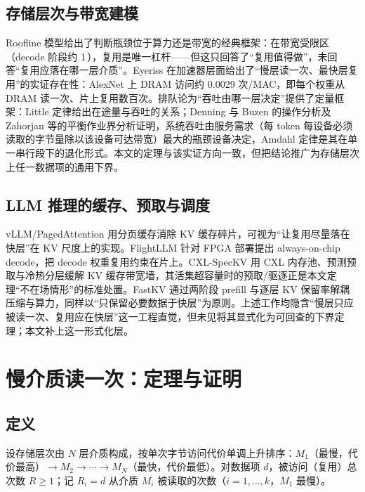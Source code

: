 \documentclass[11pt]{ctexart}
\begin{document}
\subsection{存储层次与带宽建模}

Roofline 模型\cite{roofline}给出了判断瓶颈位于算力还是带宽的经典框架：在带宽受限区（decode 阶段约 1\,），复用是唯一杠杆——但这只回答了“复用值得做”，未回答“复用应落在哪一层介质”。Eyeriss\cite{eyeriss} 在加速器层面给出了“慢层读一次、最快层复用”的实证存在性：AlexNet 上 DRAM 访问约 0.0029 次/MAC，即每个权重从 DRAM 读一次、片上复用数百次。排队论为“吞吐由哪一层决定”提供了定量框架：Little 定律\cite{little}给出在途量与吞吐的关系；Denning 与 Buzen 的操作分析\cite{denningbuzen}及 Zahorjan 等的平衡作业界分析\cite{aba}证明，系统吞吐由服务需求（每 token 每设备必须读取的字节量除以该设备可达带宽）最大的瓶颈设备决定，Amdahl 定律\cite{amdahl}是其在单一串行段下的退化形式。本文的定理与该实证方向一致，但把结论推广为存储层次上任一数据项的通用下界。

\subsection{LLM 推理的缓存、预取与调度}

vLLM/PagedAttention\cite{paged} 用分页缓存消除 KV 缓存碎片，可视为“让复用尽量落在快层”在 KV 尺度上的实现。FlightLLM\cite{flightllm} 针对 FPGA 部署提出 always-on-chip decode，把 decode 权重复用约束在片上。CXL-SpecKV\cite{cxlspeckv} 用 CXL 内存池、预测预取与冷热分层缓解 KV 缓存带宽墙，其活集超容量时的预取/驱逐正是本文定理“不在场情形”的标准处置。FastKV\cite{fastkv} 通过两阶段 prefill 与逐层 KV 保留率解耦压缩与算力，同样以“只保留必要数据于快层”为原则。上述工作均隐含“慢层只应被读一次、复用应在快层”这一工程直觉，但未见将其显式化为可回查的下界定理；本文补上这一形式化层。

\section{慢介质读一次：定理与证明}

\subsection{定义}

设存储层次由 $N$ 层介质构成，按单次字节访问代价单调上升排序：$M_1$（最慢，代价最高）$\to M_2\to\cdots\to M_N$（最快，代价最低）。对数据项 $d$，被访问（复用）总次数 $R\ge 1$；记 $R_i=d$ 从介质 $M_i$ 被读取的次数（$i=1,\dots,k$，$M_1$ 最慢）。
\end{document}
